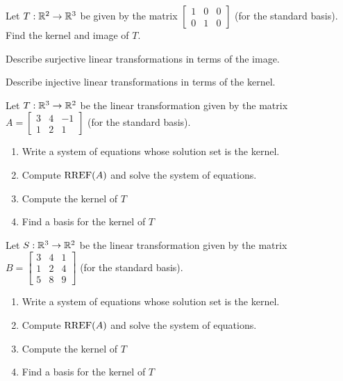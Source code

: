 \begin{applicationActivities}{2}{19}
\begin{activity}{0}
Let $T: \mathbb{R}^2 \rightarrow \mathbb{R}^3$ be given by the matrix $\begin{bmatrix} 1 & 0 &0  \\ 0 & 1 & 0 \end{bmatrix}$ (for the standard basis).  Find the kernel and image of $T$.
\end{activity}

\begin{activity}{0}
  \begin{subactivity}
    Describe surjective linear transformations in terms of the image.
  \end{subactivity}
  \begin{subactivity}
    Describe injective linear transformations in terms of the kernel.
  \end{subactivity}
\end{activity}

\begin{activity}{0}
Let $T: \mathbb{R}^3 \rightarrow \mathbb{R}^2$ be the linear transformation given by the matrix $A=\begin{bmatrix} 3 & 4 & -1 \\ 1 & 2 & 1 \end{bmatrix}$ (for the standard basis).
\begin{enumerate}[1)]
\item Write a system of equations whose solution set is the kernel.
\item Compute $\operatorname{RREF}(A)$ and solve the system of equations.
\item Compute the kernel of $T$
\item Find a basis for the kernel of $T$
\end{enumerate}
\end{activity}

\begin{activity}{0}
Let $S: \mathbb{R}^3 \rightarrow \mathbb{R}^2$ be the linear transformation given by the matrix $B=\begin{bmatrix} 3 & 4 & 1 \\ 1 & 2 & 4 \\ 5 & 8 & 9 \end{bmatrix}$ (for the standard basis).
\begin{enumerate}[1)]
\item Write a system of equations whose solution set is the kernel.
\item Compute $\operatorname{RREF}(A)$ and solve the system of equations.
\item Compute the kernel of $T$
\item Find a basis for the kernel of $T$
\end{enumerate}
\end{activity}


\end{applicationActivities}
